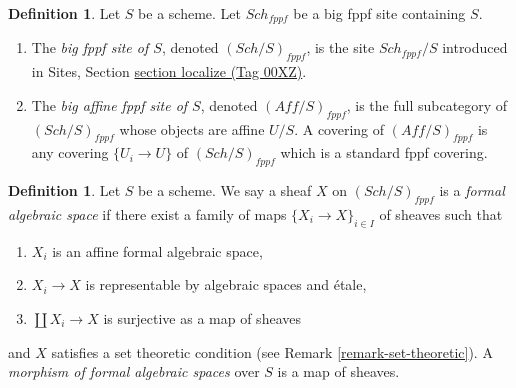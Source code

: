 \documentclass{amsart}
\theoremstyle{plain}
\theoremstyle{definition}
\newtheorem{definition}[subsection]{Definition}
\theoremstyle{remark}
\numberwithin{equation}{subsection}
\def\Sch{\mathit{Sch}}
\begin{document}
\begin{definition}
\label{topologies-definition-big-small-fppf}
Let $S$ be a scheme. Let $\Sch_{fppf}$ be a big fppf
site containing $S$.
\begin{enumerate}
\item The {\it big fppf site of $S$}, denoted
$(\Sch/S)_{fppf}$, is the site $\Sch_{fppf}/S$
introduced in Sites, Section \href{https://stacks.math.columbia.edu/tag/00XZ}{section localize (Tag 00XZ)}.
\item The {\it big affine fppf site of $S$}, denoted
$(\textit{Aff}/S)_{fppf}$, is the full subcategory of
$(\Sch/S)_{fppf}$ whose objects are affine $U/S$.
A covering of $(\textit{Aff}/S)_{fppf}$ is any covering
$\{U_i \to U\}$ of $(\Sch/S)_{fppf}$ which is a
standard fppf covering.
\end{enumerate}
\end{definition}

\begin{definition}
\label{definition-formal-algebraic-space}
Let $S$ be a scheme. We say a sheaf $X$ on $(\Sch/S)_{fppf}$ is a
{\it formal algebraic space} if there exist a family of maps
$\{X_i \to X\}_{i \in I}$ of sheaves such that
\begin{enumerate}
\item $X_i$ is an affine formal algebraic space,
\item $X_i \to X$ is representable by algebraic spaces and \'etale,
\item $\coprod X_i \to X$ is surjective as a map of sheaves
\end{enumerate}
and $X$ satisfies a set theoretic condition
(see Remark \ref{remark-set-theoretic}). A
{\it morphism of formal algebraic spaces}
over $S$ is a map of sheaves.
\end{definition}
\end{document}
